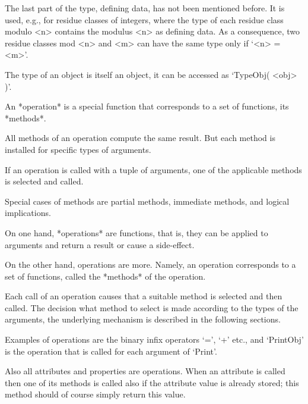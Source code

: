 The last part of the type, defining data, has not been mentioned before.
It is used, e.g., for residue classes of integers, where the type of each
residue class modulo <n> contains the modulus <n> as defining data.
As a consequence, two residue classes mod <n> and <m> can have the same
type only if `<n> = <m>'.

The type of an object is itself an object,
it can be accessed as `TypeObj( <obj> )'.


An *operation* is a special {\GAP} function that corresponds to a set of
functions, its *methods*.

All methods of an operation compute the same result.
But each method is installed for specific types of arguments.

If an operation is called with a tuple of arguments,
one of the applicable methods is selected and called.

Special cases of methods are partial methods, immediate methods,
and logical implications.


On one hand, *operations* are {\GAP} functions, that is,
they can be applied to arguments and return a result or cause a
side-effect.

On the other hand, operations are more.
Namely, an operation corresponds to a set of {\GAP} functions,
called the *methods* of the operation.


Each call of an operation causes that a suitable method is selected
and then called.
The decision what method to select is made according to the types
of the arguments,
the underlying mechanism is described in the following sections.

Examples of operations are the binary infix operators `=', `+' etc.,
and `PrintObj' is the operation that is called for each argument of
`Print'.


Also all attributes and properties are operations.
When an attribute is called then one of its methods is called
also if the attribute value is already stored;
this method should of course simply return this value.

